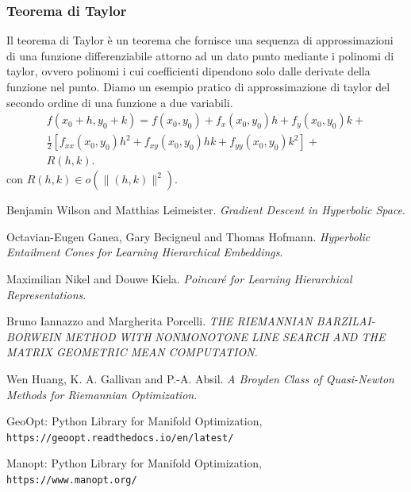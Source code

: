 \documentclass[a4paper, 12pt]{article}
\begin{document}
\subsubsection{Teorema di Taylor}
Il teorema di Taylor è un teorema che fornisce una sequenza di approssimazioni di una funzione differenziabile attorno ad un dato punto mediante i polinomi di taylor, ovvero polinomi i cui coefficienti dipendono solo dalle derivate della funzione nel punto.
Diamo un esempio pratico di approssimazione di taylor del secondo ordine di una funzione a due variabili.\\
\begin{equation*}\begin{gathered}
f(x_0+h, y_0+k) = f(x_0, y_0) + f_x(x_0, y_0)h + f_y(x_0, y_0)k + \\ \frac{1}{2}[f_{xx}(x_0, y_0)h^2 + f_{xy}(x_0, y_0)hk + f_{yy}(x_0, y_0)k^2] + \\
R(h, k).
\end{gathered}\end{equation*}
con $R(h, k) \in o(\parallel (h, k) \parallel^2)$.
\newpage
\begin{thebibliography}{9}
Benjamin Wilson and Matthias Leimeister.
\textit{Gradient Descent in Hyperbolic Space}.

Octavian-Eugen Ganea, Gary Becigneul and Thomas Hofmann.
\textit{Hyperbolic Entailment Cones for Learning Hierarchical Embeddings}.

Maximilian Nikel and Douwe Kiela.
\textit{Poincaré for Learning Hierarchical Representations}.

Bruno Iannazzo and Margherita Porcelli.
\textit{THE RIEMANNIAN BARZILAI-BORWEIN METHOD WITH NONMONOTONE LINE SEARCH AND THE MATRIX GEOMETRIC MEAN COMPUTATION}.

Wen Huang, K. A. Gallivan and P.-A. Absil.
\textit{A Broyden Class of Quasi-Newton Methods for Riemannian Optimization}.

GeoOpt: Python Library for Manifold Optimization,
\\\texttt{https://geoopt.readthedocs.io/en/latest/}

Manopt: Python Library for Manifold Optimization,
\\\texttt{https://www.manopt.org/}

\end{thebibliography}
\end{document}
